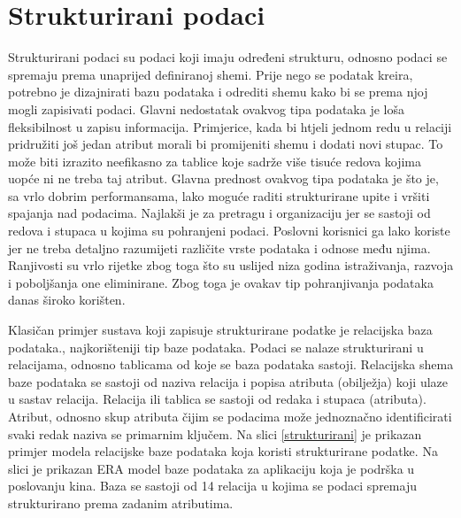 \documentclass{foi}
\begin{document}
\section{Strukturirani podaci}

Strukturirani podaci su podaci koji imaju određeni strukturu, odnosno podaci se spremaju prema unaprijed definiranoj shemi. Prije nego se podatak kreira, potrebno je dizajnirati bazu podataka i odrediti shemu kako bi se prema njoj mogli zapisivati podaci. Glavni nedostatak ovakvog tipa podataka je loša fleksibilnost u zapisu informacija. Primjerice, kada bi htjeli jednom redu u relaciji pridružiti još jedan atribut morali bi promijeniti shemu i dodati novi stupac. To može biti izrazito neefikasno za tablice koje sadrže više tisuće redova kojima uopće ni ne treba taj atribut. Glavna prednost ovakvog tipa podataka je što je, sa vrlo dobrim performansama, lako moguće raditi strukturirane upite i vršiti spajanja nad podacima. Najlakši je za pretragu i organizaciju jer se sastoji od redova i stupaca u kojima su pohranjeni podaci. Poslovni korisnici ga lako koriste jer ne treba detaljno razumijeti različite vrste podataka i odnose među njima. Ranjivosti su vrlo rijetke zbog toga što su uslijed niza godina istraživanja, razvoja i poboljšanja one eliminirane. Zbog toga je ovakav tip pohranjivanja podataka danas široko korišten. \cite{unstructuredStructuredSemiStructured}

Klasičan primjer sustava koji zapisuje strukturirane podatke je relacijska baza podataka., najkorišteniji tip baze podataka. Podaci se nalaze strukturirani u relacijama, odnosno tablicama od koje se baza podataka sastoji. Relacijska shema baze podataka se sastoji od naziva relacija i popisa atributa (obilježja) koji ulaze u sastav relacija. Relacija ili tablica se sastoji od redaka i stupaca (atributa). Atribut, odnosno skup atributa čijim se podacima može jednoznačno identificirati svaki redak naziva se primarnim ključem. \cite{informacijskaTehnologijauPoslovanju} Na slici \ref{strukturirani} je prikazan primjer modela relacijske baze podataka koja koristi strukturirane podatke. Na slici je prikazan ERA model baze podataka za aplikaciju koja je podrška u poslovanju kina. Baza se sastoji od 14 relacija u kojima se podaci spremaju strukturirano prema zadanim atributima.
\end{document}
